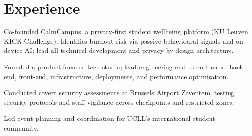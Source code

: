 


\section{Experience}

\begin{bullets}
    \item Co-founded CalmCampus, a privacy-first student wellbeing platform (KU Leuven KICK Challenge). Identifies burnout risk via passive behavioural signals and on-device AI; lead all technical development and privacy-by-design architecture.
\end{bullets}

\begin{bullets}
    \item Founded a product-focused tech studio; lead engineering end-to-end across back-end, front-end, infrastructure, deployments, and performance optimisation.
\end{bullets}

\begin{bullets}
    \item Conducted covert security assessments at Brussels Airport Zaventem, testing security protocols and staff vigilance across checkpoints and restricted zones.
\end{bullets}

\begin{bullets}
    \item Led event planning and coordination for UCLL's international student community.
\end{bullets}

